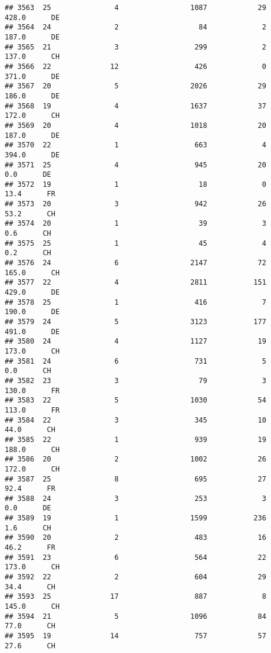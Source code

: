 \documentclass[
]{article}
\begin{document}
\begin{verbatim}
## 3563  25               4                 1087            29    428.0      DE
## 3564  24               2                   84             2    187.0      DE
## 3565  21               3                  299             2    137.0      CH
## 3566  22              12                  426             0    371.0      DE
## 3567  20               5                 2026            29    186.0      DE
## 3568  19               4                 1637            37    172.0      CH
## 3569  20               4                 1018            20    187.0      DE
## 3570  22               1                  663             4    394.0      DE
## 3571  25               4                  945            20      0.0      DE
## 3572  19               1                   18             0     13.4      FR
## 3573  20               3                  942            26     53.2      CH
## 3574  20               1                   39             3      0.6      CH
## 3575  25               1                   45             4      0.2      CH
## 3576  24               6                 2147            72    165.0      CH
## 3577  22               4                 2811           151    429.0      DE
## 3578  25               1                  416             7    190.0      DE
## 3579  24               5                 3123           177    491.0      DE
## 3580  24               4                 1127            19    173.0      CH
## 3581  24               6                  731             5      0.0      CH
## 3582  23               3                   79             3    130.0      FR
## 3583  22               5                 1030            54    113.0      FR
## 3584  22               3                  345            10     44.0      CH
## 3585  22               1                  939            19    188.0      CH
## 3586  20               2                 1002            26    172.0      CH
## 3587  25               8                  695            27     92.4      FR
## 3588  24               3                  253             3      0.0      DE
## 3589  19               1                 1599           236      1.6      CH
## 3590  20               2                  483            16     46.2      FR
## 3591  23               6                  564            22    173.0      CH
## 3592  22               2                  604            29     34.4      CH
## 3593  25              17                  887             8    145.0      CH
## 3594  21               5                 1096            84     77.0      CH
## 3595  19              14                  757            57     27.6      CH

\end{verbatim}
\end{document}
